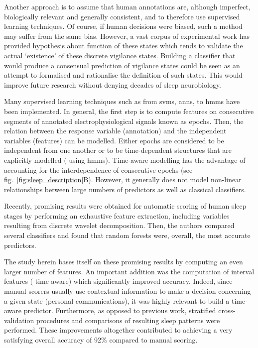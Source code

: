 Another approach is to assume that human annotations are, although imperfect, biologically relevant and generally consistent,
 and to therefore use supervised learning
 techniques\cite{crisler_sleep-stage_2008,ventouras_performance_2012,doroshenkov_classification_2007,pan_transition-constrained_2012,sen_comparative_2014}.
  Of course, if human decisions were biased, such a method may suffer from the same bias.
However, a vast corpus of experimental work has provided hypothesis about function of these states which tends to validate the actual `existence' of these discrete vigilance states\cite{diekelmann_memory_2010}.
Building a classifier that would produce a consensual prediction of vigilance states could be seen as an attempt to formalised and rationalise the definition of such states.
This would improve future research without denying decades of sleep neurobiology.

Many supervised learning techniques such as from
\glspl{svm}\cite{crisler_sleep-stage_2008},
\glspl{ann}\cite{ventouras_performance_2012},
to
\glspl{hmm}\cite{doroshenkov_classification_2007,pan_transition-constrained_2012} have been implemented.
In general, the first step is to compute features on consecutive segments of annotated electrophysiological signals known as epochs.
Then, the relation between the response variable (annotation) and the independent variables (features) can be modelled.
Either epochs are considered to be independent from one another or to be time-dependent structures that are explicitly modelled (\eg{} using \glspl{hmm}).
Time-aware modelling has the advantage of accounting for the interdependence of consecutive epochs (see fig.~\ref{fig:sleep_description}B).
However, it generally does not model non-linear relationships between large numbers of predictors as well as classical classifiers.

Recently, promising results were obtained for automatic scoring of human sleep stages by performing an exhaustive
feature extraction, including variables resulting from discrete wavelet
decomposition\cite{sen_comparative_2014}.
Then, the authors compared several classifiers and found that random
forests\cite{breiman_random_2001} were, overall, the most accurate predictors.

The study herein bases itself on these promising results by computing an even larger number of features.
An important addition was the computation of interval
features (\ie{} time aware)
\cite{dietterich_machine_2002,rodriguez_support_2005,deng_time_2013} which significantly improved
accuracy. 
Indeed, since manual scorers usually use contextual information to make a decision concerning a given state (personal communications),
it was highly relevant to build a time-aware predictor.
Furthermore, as opposed to previous work, stratified cross-validation\cite{ding_querying_2008} procedures and
comparisons of resulting sleep patterns were performed.
These improvements altogether contributed to achieving a very satisfying overall accuracy of 92\% 
compared to manual scoring.


